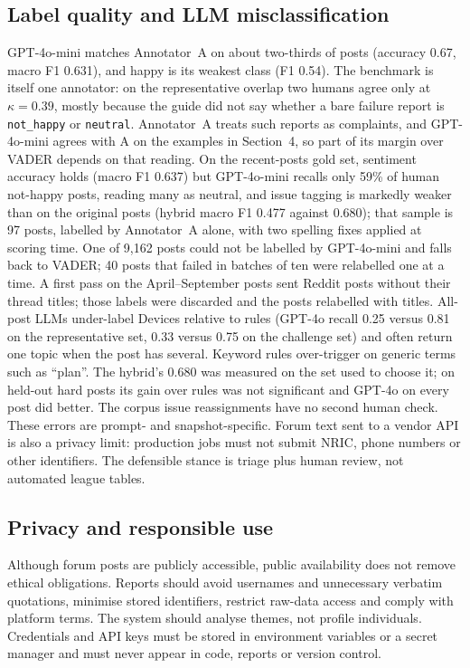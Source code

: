 \documentclass[11pt,a4paper]{article}
\begin{document}
\subsection{Label quality and LLM misclassification}

GPT-4o-mini matches Annotator~A on about two-thirds of posts (accuracy 0.67, macro F1 0.631), and happy is its weakest class (F1 0.54). The benchmark is itself one annotator: on the representative overlap two humans agree only at $\kappa=0.39$, mostly because the guide did not say whether a bare failure report is \texttt{not\_happy} or \texttt{neutral}. Annotator~A treats such reports as complaints, and GPT-4o-mini agrees with A on the examples in Section~4, so part of its margin over VADER depends on that reading. On the recent-posts gold set, sentiment accuracy holds (macro F1 0.637) but GPT-4o-mini recalls only 59\% of human not-happy posts, reading many as neutral, and issue tagging is markedly weaker than on the original posts (hybrid macro F1 0.477 against 0.680); that sample is 97 posts, labelled by Annotator~A alone, with two spelling fixes applied at scoring time. One of 9,162 posts could not be labelled by GPT-4o-mini and falls back to VADER; 40 posts that failed in batches of ten were relabelled one at a time. A first pass on the April--September posts sent Reddit posts without their thread titles; those labels were discarded and the posts relabelled with titles. All-post LLMs under-label Devices relative to rules (GPT-4o recall 0.25 versus 0.81 on the representative set, 0.33 versus 0.75 on the challenge set) and often return one topic when the post has several. Keyword rules over-trigger on generic terms such as ``plan''. The hybrid's 0.680 was measured on the set used to choose it; on held-out hard posts its gain over rules was not significant and GPT-4o on every post did better. The corpus issue reassignments have no second human check. These errors are prompt- and snapshot-specific. Forum text sent to a vendor API is also a privacy limit: production jobs must not submit NRIC, phone numbers or other identifiers. The defensible stance is triage plus human review, not automated league tables.

\subsection{Privacy and responsible use}

Although forum posts are publicly accessible, public availability does not remove ethical obligations. Reports should avoid usernames and unnecessary verbatim quotations, minimise stored identifiers, restrict raw-data access and comply with platform terms. The system should analyse themes, not profile individuals. Credentials and API keys must be stored in environment variables or a secret manager and must never appear in code, reports or version control.
\end{document}
